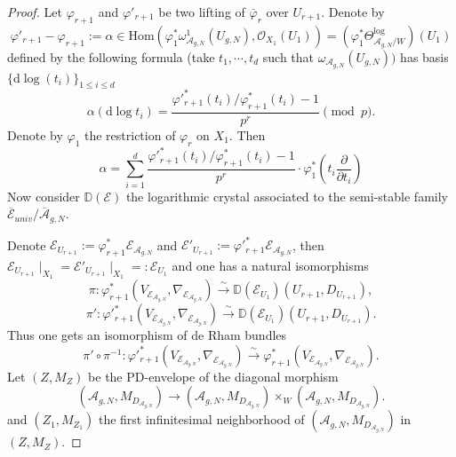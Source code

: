 \documentclass[12pt,twoside]{book}
\theoremstyle{plain}
\theoremstyle{definition}
\theoremstyle{remark}
\numberwithin{equation}{section}
\begin{document}
\begin{proof}
Let $\varphi_{r+1}$ and $\varphi'_{r+1}$ be two lifting of $\overline{\varphi}_r$ over $U_{r+1}$. Denote by
\[\varphi'_{r+1}-\varphi_{r+1} := \alpha \in \mathrm{Hom}(\varphi_{1}^*\omega_{{\mathcal A_{g,N}}}^1(U_{g,N}),\mathcal O_{X_1}(U_{1})) = \left(\varphi_1^*\Theta^{\log}_{{\mathcal A_{g,N}}/W}\right) (U_{1})\]
defined by the following formula (take $t_1,\cdots,t_d$ such that $\omega_{\mathcal A_{g,N}}(U_{g,N}))$ has basis $\{\mathrm{d}\log(t_i)\}_{1\leq i\leq d}$
\[\alpha(\mathrm{d}\log t_i)= \frac{\varphi'^*_{r+1}(t_i)/\varphi_{r+1}^*(t_i)-1}{p^r} \pmod{p}.\]
Denote by $\varphi_1$ the restriction of $\varphi_r$ on $X_1$. Then
\begin{equation}
\label{alpha:explicite}
\alpha = \sum_{i=1}^{d} \frac{\varphi'^*_{r+1}(t_i)/\varphi_{r+1}^*(t_i)-1}{p^r}\cdot \varphi_1^*\left(t_i\frac{\partial}{\partial t_i}\right)
\end{equation}
Now consider $\mathbb D(\mathcal E)$ the logarithmic crystal associated to the semi-stable family $\overline{\mathcal E}_{univ}/{\overline{\mathcal A}_{g,N}}$.

Denote $\mathcal E_{U_{r+1}}:= \varphi_{r+1}^* \mathcal E_{{\mathcal A_{g,N}}}$ and $\mathcal E'_{U_{r+1}}:= \varphi'^*_{r+1} \mathcal E_{{\mathcal A_{g,N}}}$, then $\mathcal E_{U_{r+1}}\mid_{X_1} = \mathcal E'_{U_{r+1}}\mid_{X_1} =: \mathcal E_{U_1}$ and one has a natural isomorphisms
\[\pi: \varphi_{r+1}^*(V_{\mathcal E_{{\mathcal A_{g,N}}}},\nabla_{\mathcal E_{{\mathcal A_{g,N}}}}) \overset{\sim}\longrightarrow \mathbb D(\mathcal E_{U_1})(U_{r+1},D_{U_{r+1}}),\]
\[\pi': \varphi'^*_{r+1}(V_{\mathcal E_{{\mathcal A_{g,N}}}},\nabla_{\mathcal E_{{\mathcal A_{g,N}}}}) \overset{\sim}\longrightarrow \mathbb D(\mathcal E_{U_1})(U_{r+1},D_{U_{r+1}}).\]
Thus one gets an isomorphism of de Rham bundles
\[\pi'\circ\pi^{-1}:\varphi'^*_{r+1}(V_{\mathcal E_{{\mathcal A_{g,N}}}},\nabla_{\mathcal E_{{\mathcal A_{g,N}}}}) \overset{\sim}\longrightarrow \varphi_{r+1}^*(V_{\mathcal E_{{\mathcal A_{g,N}}}},\nabla_{\mathcal E_{{\mathcal A_{g,N}}}}).\]
Let $(Z,M_Z)$ be the PD-envelope of the diagonal morphism
\[({\mathcal A_{g,N}},M_{D_{{\mathcal A_{g,N}}}}) \rightarrow ({\mathcal A_{g,N}},M_{D_{{\mathcal A_{g,N}}}})\times_W ({\mathcal A_{g,N}},M_{D_{{\mathcal A_{g,N}}}}).\]
and $(Z_1,M_{Z_1})$ the first infinitesimal neighborhood of $({\mathcal A_{g,N}},M_{D_{{\mathcal A_{g,N}}}})$ in $(Z,M_Z)$.


\end{proof}
\end{document}
